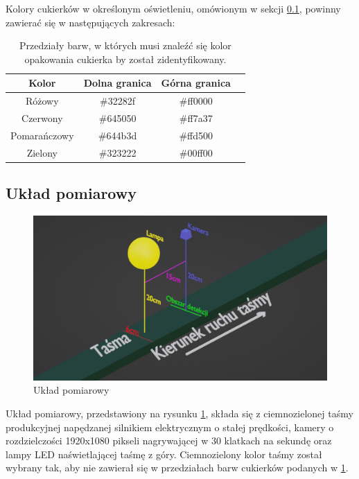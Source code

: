 \documentclass{article}
\begin{document}
Kolory cukierków w określonym oświetleniu, omówionym w sekcji \ref{Układ pomiarowy}, powinny zawierać się w następujących zakresach:

\begin{table}[H]
    \label{tab:tab1}
    \centering
    \begin{tabular}{ |c|c|c|c| }
     \hline
     Kolor & Dolna granica & Górna granica \\
     \hline
     Różowy & \#32282f & \#ff0000 \\
     \hline
     Czerwony & \#645050 & \#ff7a37 \\
     \hline
     Pomarańczowy & \#644b3d & \#ffd500 \\
     \hline
     Zielony & \#323222 & \#00ff00 \\
     \hline
    \end{tabular}
    \caption{Przedziały barw, w których musi znaleźć się kolor opakowania cukierka by został zidentyfikowany.}
\end{table}

\subsection{Układ pomiarowy}
\label{Układ pomiarowy}

\begin{figure}[H]
    \centering
    \includegraphics[width=\linewidth]{ukladPomiarowy.png}
    \caption{Układ pomiarowy}
    \label{fig:ukladPomiarowy}
\end{figure}

Układ pomiarowy, przedstawiony na rysunku \ref{fig:ukladPomiarowy}, składa się z ciemnozielonej taśmy produkcyjnej napędzanej silnikiem elektrycznym o stałej prędkości, kamery o rozdzielczości 1920x1080 pikseli nagrywającej w 30 klatkach na sekundę oraz lampy LED naświetlającej taśmę z góry. Ciemnozielony kolor taśmy został wybrany tak, aby nie zawierał się w przedziałach barw cukierków podanych w \ref{tab:tab1}.
\end{document}

